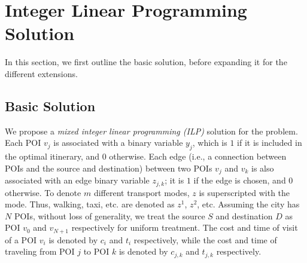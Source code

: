 \section{Integer Linear Programming Solution}
\label{sec:ilp}

In this section, we first outline the basic solution, before expanding it for
the different extensions.

\subsection{Basic Solution}
\label{sec:basic}

We propose a \emph{mixed integer linear programming (ILP)} solution for
the \trip problem.  Each POI $v_{j}$ is associated with a binary
variable $y_{j}$, which is $1$ if it is included in the optimal
itinerary, and $0$ otherwise.  Each edge (i.e., a connection between
POIs and the source and destination) between two POIs $v_{j}$ and
$v_{k}$ is also associated with an edge binary variable $z_{j,k}$; it is
$1$ if the edge is chosen, and $0$ otherwise.  To denote $m$ different
transport modes, $z$ is superscripted with the mode.  Thus, walking,
taxi, etc. are denoted as $z^1$, $z^2$, etc.  Assuming the city has $N$
POIs, without loss of generality, we treat the source $S$ and
destination $D$ as POI $v_{0}$ and $v_{{N+1}}$ respectively for uniform
treatment.  The cost and time of visit of a POI $v_i$ is denoted by
$c_i$ and $t_i$ respectively, while the cost and time of traveling from
POI $j$ to POI $k$ is denoted by $c_{j,k}$ and $t_{j,k}$ respectively.

